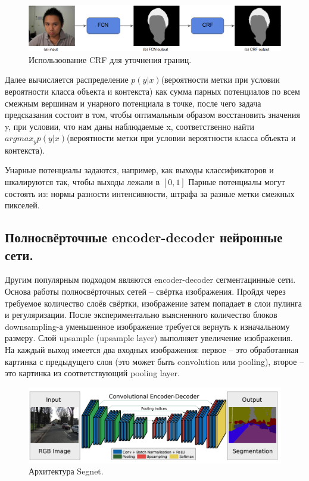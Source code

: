 \documentclass{article}
\begin{document}
\begin{figure}[h!]
\includegraphics[width=\linewidth]{crf.png}
\caption{Использоование CRF для уточнения границ.}
\end{figure}

Далее вычисляется распределение $p(y| x)$(вероятности метки при условии вероятности класса объекта и контекста) как сумма парных потенциалов по всем смежным вершинам и унарного потенциала в точке, после чего задача предсказания состоит в том, чтобы оптимальным образом восстановить значения y, при условии, что нам даны наблюдаемые x, соответственно найти $argmax_y p(y| x)$(вероятности метки при условии вероятности класса объекта и контекста). 

Унарные потенциалы задаются, например, как выходы классификаторов и шкалируются так, чтобы выходы лежали в $[0,1]$  Парные потенциалы могут состоять из: нормы разности интенсивности, штрафа за разные метки смежных пикселей.

\subsection{Полносвёрточные encoder-decoder нейронные сети.}
Другим популярным подходом являются encoder-decoder сегментацинные сети\cite{badrinarayanan_segnet:_2015}. Основа работы полносвёрточных сетей – свёртка изображения. Пройдя через требуемое количество слоёв свёртки, изображение затем попадает в слои пулинга  и регуляризации. После экспериментально выясненного количество блоков downsampling-а уменьшенное изображение требуется вернуть к изначальному размеру. Слой upsample (upsample layer) выполняет увеличение изображения. На каждый выход имеется два входных изображения: первое – это обработанная картинка с предыдущего слоя (это может быть convolution или pooling), второе – это картинка из соответствующий pooling layer.  

\begin{figure}[h!]
\includegraphics[width=\linewidth]{ed.png}
\caption{Архитектура Segnet.}
\end{figure}
\end{document}
